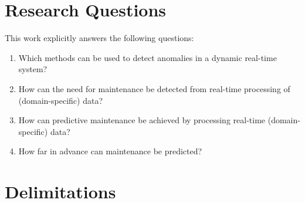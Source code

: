 \section{Research Questions}
\label{sec:research-questions}
This work explicitly answers the following questions:
\begin{enumerate}
  \item Which methods can be used to detect anomalies in a dynamic real-time system?
  \item How can the need for maintenance be detected from real-time processing of (domain-specific) data?
  \item How can predictive maintenance be achieved by processing real-time (domain-specific) data?
  \item How far in advance can maintenance be predicted?
\end{enumerate}

\section{Delimitations}
\label{sec:delimitations}
